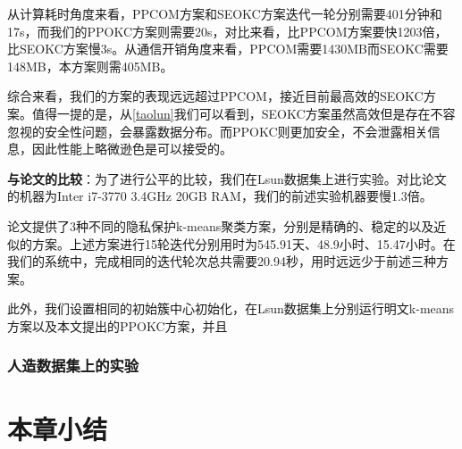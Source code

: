 \begin{table}[htbp]
	\centering
	\renewcommand{\arraystretch}{1.3} %
	\caption{scheme comparison ($n=8192,m=5,k=3$)}
	\label{s3-ta-duibi}
\end{table}
从计算耗时角度来看，PPCOM方案和SEOKC方案迭代一轮分别需要401分钟和17s，而我们的PPOKC方案则需要20s，对比来看，比PPCOM方案要快1203倍，比SEOKC方案慢3s。从通信开销角度来看，PPCOM需要1430MB而SEOKC需要148MB，本方案则需405MB。

综合来看，我们的方案的表现远远超过PPCOM，接近目前最高效的SEOKC方案。值得一提的是，从\ref{taolun}我们可以看到，SEOKC方案虽然高效但是存在不容忽视的安全性问题，会暴露数据分布。而PPOKC则更加安全，不会泄露相关信息，因此性能上略微逊色是可以接受的。

\textbf{与论文\cite{jaschke2019unsupervised}的比较}：为了进行公平的比较，我们在Lsun数据集上进行实验。对比论文的机器为Inter i7-3770 3.4GHz 20GB RAM，我们的前述实验机器要慢1.3倍。

论文\cite{jaschke2019unsupervised}提供了3种不同的隐私保护k-means聚类方案，分别是精确的、稳定的以及近似的方案。上述方案进行15轮迭代分别用时为545.91天、48.9小时、15.47小时。在我们的系统中，完成相同的迭代轮次总共需要20.94秒，用时远远少于前述三种方案。

此外，我们设置相同的初始簇中心初始化，在Lsun数据集上分别运行明文k-means方案以及本文提出的PPOKC方案，并且
\subsubsection{人造数据集上的实验}
\section{本章小结}
\label{s3-xiaojie}